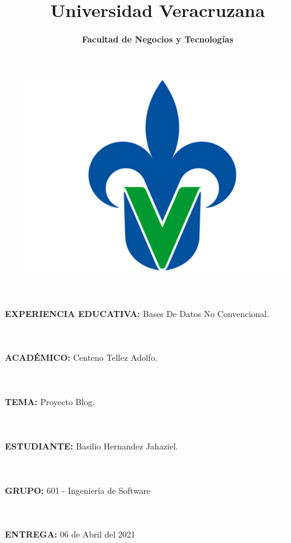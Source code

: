\documentclass[60pt]{article}
\title{\textbf{Universidad Veracruzana}}
\date{\textbf{Facultad de Negocios y Tecnologías}}
\begin{document}
\maketitle
\begin{figure}[htb]
\centering
\includegraphics[width=0.5\linewidth]{logo1.png}
\end{figure}

\maketitle
\textsf{\Large 
\\
\\
\textbf{EXPERIENCIA EDUCATIVA:} Bases De Datos No Convencional. \\}
\\
\\ 
\maketitle
\textsf{\Large \textbf{ACADÉMICO:} Centeno Tellez Adolfo. \\}
\\
\\
\maketitle
\textsf{\Large \textbf{TEMA:} Proyecto Blog. \\}
\\
\\
\maketitle
\textsf{\Large \textbf{ESTUDIANTE:} Basilio Hernandez Jahaziel. \\}
\\
\\ 
\maketitle
\textsf{\Large \textbf{GRUPO:} 601 - Ingeniería de Software \\}
\\
\\
\maketitle
\textsf{\Large \textbf{ENTREGA:} 06 de Abril del 2021 \\}
\end{document}
